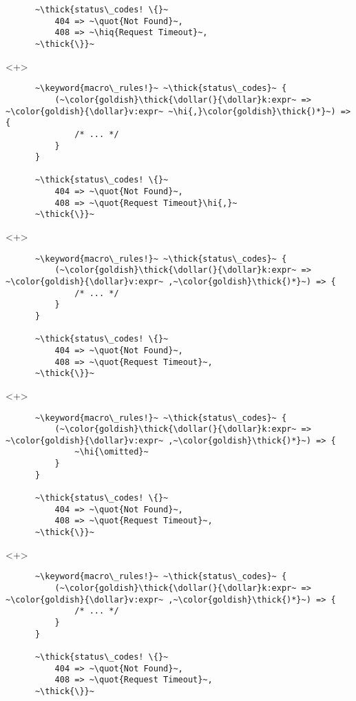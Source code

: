 \documentclass[usepdftitle=false]{beamer}
\newcommand{\dollar}{\makebox[\widthof{\$}][c]{\$}}
\newcommand{\thick}[1]{\contourlength{0.16pt}\contour[10]{black}{#1}}
\newcommand{\slantbox}[2][.5]
  {%
    \mbox
      {%
        \sbox{\foobox}{#2}%
        \hskip\wd\foobox
        \pdfsave
        \pdfsetmatrix{1 0 #1 1}%
        \llap{\usebox{\foobox}}%
        \pdfrestore
      }%
  }
\newcommand{\backslantbox}[2][.5]
  {%
    \mbox
      {%
        \sbox{\foobox}{#2}%
        \hskip\wd\foobox
        \pdfsave
        \pdfsetmatrix{-1 0 #1 1}%
        \llap{\usebox{\foobox}}%
        \pdfrestore
      }%
  }
\newcommand{\hi}[1]{%
\tikz[baseline=(A.base)]
 \node[highlighting=yellowbg,inner sep=0pt,text depth=0pt] (A) {#1};%
}
\newcommand{\openquote}{\backslantbox[.2]{\hspace{11pt}''\hspace{-11pt}}}
\newcommand{\closequote}{\slantbox[-.2]{\hspace{2pt}''\hspace{-2pt}}}
\newcommand{\hiq}[1]{\hi{\openquote#1\closequote}}
\newcommand{\blackquote}[1]{\openquote#1\closequote}
\newcommand{\quot}[1]{{\color{redish}\blackquote{#1}}}
\newcommand{\keyword}[1]{\color{greenish}#1}
\newcommand{\omitted}{/* ... */}
\begin{document}
\begin{frame}[fragile]
\begin{onlyenv}
\begin{verbatim}
      ~\thick{status\_codes! \{}~
          404 => ~\quot{Not Found}~,
          408 => ~\hiq{Request Timeout}~,
      ~\thick{\}}~
    \end{verbatim}
  \end{onlyenv}
  \begin{onlyenv}<+>
    \begin{verbatim}
      ~\keyword{macro\_rules!}~ ~\thick{status\_codes}~ {
          (~\color{goldish}\thick{\dollar(}{\dollar}k:expr~ => ~\color{goldish}{\dollar}v:expr~ ~\hi{,}\color{goldish}\thick{)*}~) => {
              /* ... */
          }
      }

      ~\thick{status\_codes! \{}~
          404 => ~\quot{Not Found}~,
          408 => ~\quot{Request Timeout}\hi{,}~
      ~\thick{\}}~
    \end{verbatim}
  \end{onlyenv}
  \begin{onlyenv}<+>
    \begin{verbatim}
      ~\keyword{macro\_rules!}~ ~\thick{status\_codes}~ {
          (~\color{goldish}\thick{\dollar(}{\dollar}k:expr~ => ~\color{goldish}{\dollar}v:expr~ ,~\color{goldish}\thick{)*}~) => {
              /* ... */
          }
      }

      ~\thick{status\_codes! \{}~
          404 => ~\quot{Not Found}~,
          408 => ~\quot{Request Timeout}~,
      ~\thick{\}}~
    \end{verbatim}
  \end{onlyenv}
  \begin{onlyenv}<+>
    \begin{verbatim}
      ~\keyword{macro\_rules!}~ ~\thick{status\_codes}~ {
          (~\color{goldish}\thick{\dollar(}{\dollar}k:expr~ => ~\color{goldish}{\dollar}v:expr~ ,~\color{goldish}\thick{)*}~) => {
              ~\hi{\omitted}~
          }
      }

      ~\thick{status\_codes! \{}~
          404 => ~\quot{Not Found}~,
          408 => ~\quot{Request Timeout}~,
      ~\thick{\}}~
    \end{verbatim}
  \end{onlyenv}
  \begin{onlyenv}<+>
    \begin{verbatim}
      ~\keyword{macro\_rules!}~ ~\thick{status\_codes}~ {
          (~\color{goldish}\thick{\dollar(}{\dollar}k:expr~ => ~\color{goldish}{\dollar}v:expr~ ,~\color{goldish}\thick{)*}~) => {
              /* ... */
          }
      }

      ~\thick{status\_codes! \{}~
          404 => ~\quot{Not Found}~,
          408 => ~\quot{Request Timeout}~,
      ~\thick{\}}~
    \end{verbatim}
  \end{onlyenv}
\end{frame}
\end{document}
